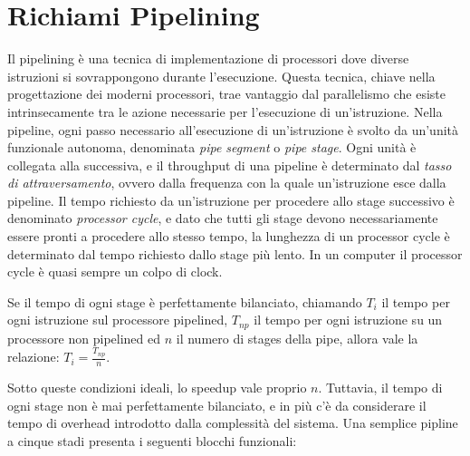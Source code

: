 \section{Richiami Pipelining}
Il pipelining è una tecnica di implementazione di processori dove diverse istruzioni si sovrappongono durante l'esecuzione. Questa tecnica, chiave nella progettazione dei moderni processori, trae vantaggio dal parallelismo che esiste intrinsecamente tra le azione necessarie per l'esecuzione di un'istruzione.
Nella pipeline, ogni passo necessario all'esecuzione di un'istruzione è svolto da un'unità funzionale autonoma, denominata \textit{pipe segment} o \textit{pipe stage}. Ogni unità è collegata alla successiva, e il throughput di una pipeline è determinato dal \textit{tasso di attraversamento}, ovvero dalla frequenza con la quale un'istruzione esce dalla pipeline. Il tempo richiesto da un'istruzione per procedere allo stage successivo è denominato \textit{processor cycle}, e dato che tutti gli stage devono necessariamente essere pronti a procedere allo stesso tempo, la lunghezza di un processor cycle è determinato dal tempo richiesto dallo stage più lento. In un computer il processor cycle è quasi sempre un colpo di clock. 

\noindent
Se il tempo di ogni stage è perfettamente bilanciato, chiamando $T_i$ il tempo per ogni istruzione sul processore pipelined, $T_{np}$ il tempo per ogni istruzione su un processore non pipelined ed $n$ il numero di stages della pipe, allora vale la relazione: $T_i = \frac{T_{np}}{n}$.

\noindent Sotto queste condizioni ideali, lo speedup vale proprio $n$. Tuttavia, il tempo di ogni stage non è mai perfettamente bilanciato, e in più c'è da considerare il tempo di overhead introdotto dalla complessità del sistema. 
Una semplice pipline a cinque stadi presenta i seguenti blocchi funzionali:

